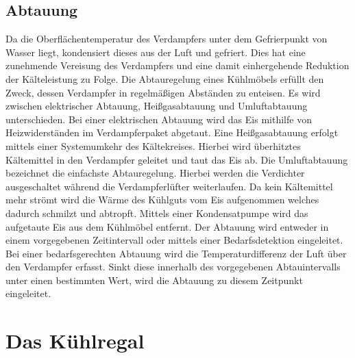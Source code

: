 \subsection{Abtauung}
\label{subsec:Abtauung}

Da die Oberflächentemperatur des Verdampfers unter dem Gefrierpunkt von Wasser liegt, kondensiert dieses aus der Luft und gefriert. Dies hat eine zunehmende Vereisung des Verdampfers und eine damit einhergehende Reduktion der Kälteleistung zu Folge.
Die Abtauregelung eines Kühlmöbels erfüllt den Zweck, dessen Verdampfer in regelmäßigen Abständen zu enteisen. Es wird zwischen elektrischer Abtauung, Heißgasabtauung und Umluftabtauung unterschieden. Bei einer elektrischen Abtauung wird das Eis mithilfe von Heizwiderständen im Verdampferpaket abgetaut. Eine Heißgasabtauung erfolgt mittels einer Systemumkehr des Kältekreises. Hierbei wird überhitztes Kältemittel in den Verdampfer geleitet und taut das Eis ab. Die Umluftabtauung bezeichnet die einfachste Abtauregelung. Hierbei werden die Verdichter ausgeschaltet während die Verdampferlüfter weiterlaufen. Da kein Kältemittel mehr strömt wird die Wärme des Kühlguts vom Eis aufgenommen welches dadurch schmilzt und abtropft. Mittels einer Kondensatpumpe wird das aufgetaute Eis aus dem Kühlmöbel entfernt. \newline
Der Abtauung wird entweder in einem vorgegebenen Zeitintervall oder mittels einer Bedarfsdetektion eingeleitet. Bei einer bedarfsgerechten Abtauung wird die Temperaturdifferenz der Luft über den Verdampfer erfasst. Sinkt diese innerhalb des vorgegebenen Abtauintervalls unter einen bestimmten Wert, wird die Abtauung zu diesem Zeitpunkt eingeleitet.

\clearpage

\section{Das Kühlregal}
\label{sec:Das Kühlregal}

